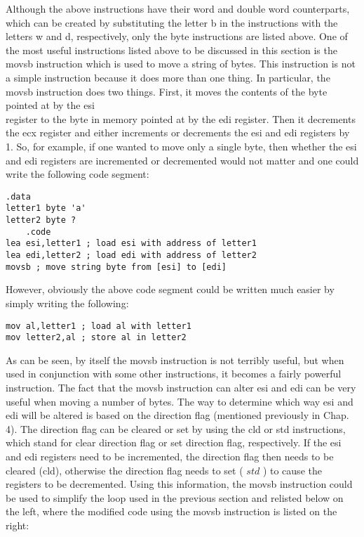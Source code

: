 \documentclass[10pt]{article}
\begin{document}
Although the above instructions have their word and double word counterparts, which can be created by substituting the letter b in the instructions with the letters w and d, respectively, only the byte instructions are listed above. One of the most useful instructions listed above to be discussed in this section is the movsb instruction which is used to move a string of bytes. This instruction is not a simple instruction because it does more than one thing. In particular, the movsb instruction does two things. First, it moves the contents of the byte pointed at by the esi\\
register to the byte in memory pointed at by the edi register. Then it decrements the ecx register and either increments or decrements the esi and edi registers by 1. So, for example, if one wanted to move only a single byte, then whether the esi and edi registers are incremented or decremented would not matter and one could write the following code segment:

\begin{verbatim}
.data
letter1 byte 'a'
letter2 byte ?
    .code
lea esi,letter1 ; load esi with address of letter1
lea edi,letter2 ; load edi with address of letter2
movsb ; move string byte from [esi] to [edi]
\end{verbatim}

However, obviously the above code segment could be written much easier by simply writing the following:

\begin{verbatim}
mov al,letter1 ; load al with letter1
mov letter2,al ; store al in letter2
\end{verbatim}

As can be seen, by itself the movsb instruction is not terribly useful, but when used in conjunction with some other instructions, it becomes a fairly powerful instruction. The fact that the movsb instruction can alter esi and edi can be very useful when moving a number of bytes. The way to determine which way esi and edi will be altered is based on the direction flag (mentioned previously in Chap. 4). The direction flag can be cleared or set by using the cld or std instructions, which stand for clear direction flag or set direction flag, respectively. If the esi and edi registers need to be incremented, the direction flag then needs to be cleared (cld), otherwise the direction flag needs to set ( $s t d$ ) to cause the registers to be decremented. Using this information, the movsb instruction could be used to simplify the loop used in the previous section and relisted below on the left, where the modified code using the movsb instruction is listed on the right:
\end{document}
